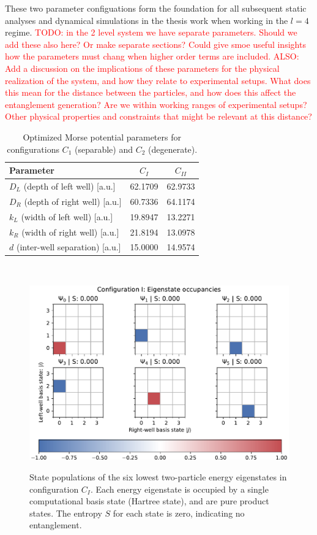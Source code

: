 \documentclass{subfiles}
\begin{document}
These two parameter configuations form the foundation for all subsequent static analyses and dynamical simulations in the thesis work when working in the $l=4$ regime. \textcolor{red}{TODO: in the 2 level system we have separate parameters. Should we add these also here? Or make separate sections? Could give smoe useful insights how the parameters must chang when higher order terms are included. ALSO: Add a discussion on the implications of these parameters for the physical realization of the system, and how they relate to experimental setups. What does this mean for the distance between the particles, and how does this affect the entanglement generation? Are we within working ranges of experimental setups? Other physical properties and constraints that might be relevant at this distance?}
\begin{table}[h!]
  \centering
  \caption{Optimized Morse potential parameters for configurations \(C_1\) (separable) and \(C_2\) (degenerate).}
  \label{tab:optimized_params}
  \begin{tabular}{lcc}
    \toprule
    Parameter & $C_{I}$ & $C_{II}$ \\
    \midrule
    \(D_L\) (depth of left well)       [a.u.] & 62.1709 & 62.9733 \\
    \(D_R\) (depth of right well)      [a.u.] & 60.7336 & 64.1174 \\
    \(k_L\) (width of left well)       [a.u.] & 19.8947 & 13.2271 \\
    \(k_R\) (width of right well)      [a.u.] & 21.8194 & 13.0978 \\
    \(d\)   (inter-well separation)     [a.u.] & 15.0000 & 14.9574 \\
    \bottomrule
  \end{tabular}
\end{table}
\\
\begin{figure}[h!]
  \centering
  \includegraphics[width=1.0\textwidth]{figs/state_populations_I.pdf}
  \label{fig:populations_I}
  \caption{State populations of the six lowest two-particle energy eigenstates in configuration $C_I$. Each energy eigenstate is occupied by a single computational basis state (Hartree state), and are pure product states. The entropy $S$ for each state is zero, indicating no entanglement.}
\end{figure}
\end{document}
